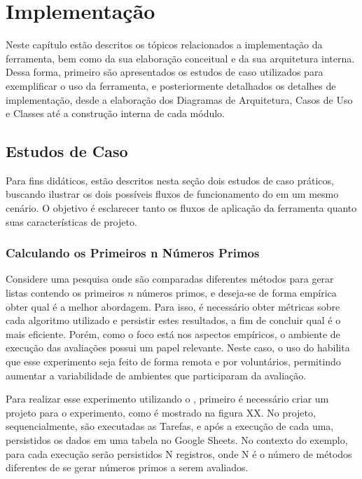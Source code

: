 \documentclass[12pt]{tcc}
\begin{document}
\chapter{Implementação}
\label{cap:implementação}

Neste capítulo estão descritos os tópicos relacionados a implementação da ferramenta, bem como da sua elaboração conceitual e da sua arquitetura interna. Dessa forma, primeiro são apresentados os estudos de caso utilizados para exemplificar o uso da ferramenta, e posteriormente detalhados os detalhes de implementação, desde a elaboração dos Diagramas de Arquitetura, Casos de Uso e Classes até a construção interna de cada módulo.

\section{Estudos de Caso}

Para fins didáticos, estão descritos nesta seção dois estudos de caso práticos, buscando ilustrar os dois possíveis fluxos de funcionamento do  em um mesmo cenário.
O objetivo é esclarecer tanto os fluxos de aplicação da ferramenta quanto suas características de projeto.

\subsection{Calculando os Primeiros n Números Primos}

Considere uma pesquisa onde são comparadas diferentes métodos para gerar listas contendo os primeiros $n$ números primos, e deseja-se de forma empírica obter qual é a melhor abordagem.
Para isso, é necessário obter métricas sobre cada algoritmo utilizado e persistir estes resultados, a fim de concluir qual é o mais eficiente.
Porém, como o foco está nos aspectos empíricos, o ambiente de execução das avaliações possui um papel relevante.
Neste caso, o uso do  habilita que esse experimento seja feito de forma remota e por voluntários, permitindo aumentar a variabilidade de ambientes que participaram da avaliação.

Para realizar esse experimento utilizando o , primeiro é necessário criar um projeto para o experimento, como é mostrado na figura XX. No projeto, sequencialmente, são executadas as Tarefas, e após a execução de cada uma, persistidos os dados em uma tabela no Google Sheets. No contexto do exemplo, para cada execução serão persistidos N registros, onde N é o número de métodos diferentes de se gerar números primos a serem avaliados.
\end{document}
